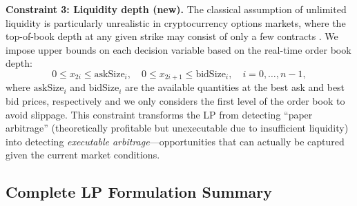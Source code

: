\documentclass[openany]{book}
\numberwithin{figure}{chapter}
\numberwithin{equation}{chapter}
\begin{document}
\textbf{Constraint 3: Liquidity depth (new).} The classical assumption of unlimited liquidity is particularly unrealistic in cryptocurrency options markets, where the top-of-book depth at any given strike may consist of only a few contracts \cite{goyenko2009}. We impose upper bounds on each decision variable based on the real-time order book depth:
\begin{equation}
0 \leq x_{2i} \leq \text{askSize}_i, \quad 0 \leq x_{2i+1} \leq \text{bidSize}_i, \quad i = 0, \ldots, n-1,
\label{eq:liquidity}
\end{equation}
where $\text{askSize}_i$ and $\text{bidSize}_i$ are the available quantities at the best ask and best bid prices, respectively and we only considers the first level of the order book to avoid slippage. This constraint transforms the LP from detecting ``paper arbitrage'' (theoretically profitable but unexecutable due to insufficient liquidity) into detecting \textit{executable arbitrage}---opportunities that can actually be captured given the current market conditions.

\subsection{Complete LP Formulation Summary}
\end{document}

